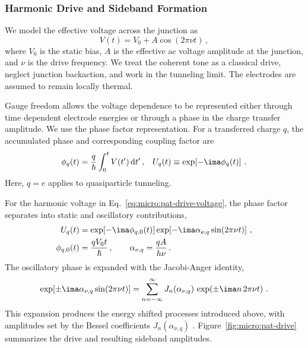         \subsubsection*{Harmonic Drive and Sideband Formation}

        We model the effective voltage across the junction as
        \begin{equation}
            V(t) = V_0 + A\cos(2\pi\nu t)\,,
            \label{eq:micro:pat-drive-voltage}
        \end{equation}
        where $V_0$ is the static bias, $A$ is the effective ac voltage amplitude at the junction, and $\nu$ is the drive frequency. We treat the coherent tone as a classical drive, neglect junction backaction, and work in the tunneling limit. The electrodes are assumed to remain locally thermal.

        Gauge freedom allows the voltage dependence to be represented either through time dependent electrode energies or through a phase in the charge transfer amplitude. We use the phase factor representation. For a transferred charge $q$, the accumulated phase and corresponding coupling factor are
        \begin{align}
            \phi_q(t)
            = \frac{q}{\hbar}\int_0^t V(t')\,\mathrm{d}t'\,, &&
            U_q(t)
            \equiv \exp\!\left[-\ima\phi_q(t)\right]\,.
            \label{eq:micro:pat-phase}
        \end{align}
        Here, $q=e$ applies to quasiparticle tunneling.

        For the harmonic voltage in Eq.~\eqref{eq:micro:pat-drive-voltage}, the phase factor separates into static and oscillatory contributions,
        \begin{align}
            U_q(t)
            &= \exp\!\left[-\ima\phi_{q,0}(t)\right]
            \exp\!\left[-\ima\alpha_{\nu, q}\sin(2\pi\nu t)\right]\,,\\
            \phi_{q,0}(t)
            &= \frac{qV_0t}{\hbar}\,,
            \qquad
            \alpha_{\nu, q} = \frac{qA}{h\nu}\,.
        \end{align}
        The oscillatory phase is expanded with the Jacobi-Anger identity,
        \begin{equation}
            \exp\!\left[\pm\ima\alpha_{\nu, q}\sin(2\pi\nu t)\right]
            = \sum_{n=-\infty}^{\infty}
            J_n(\alpha_{\nu, q})\,
            \exp\!\left(\pm\ima n\,2\pi\nu t\right)\,.
            \label{eq:micro:pat-jacobi-anger}
        \end{equation}
        This expansion produces the energy shifted processes introduced above, with amplitudes set by the Bessel coefficients $J_n(\alpha_{\nu, q})$ \cite{nist_dlmf_2025}. Figure~\ref{fig:micro:pat-drive} summarizes the drive and resulting sideband amplitudes.


